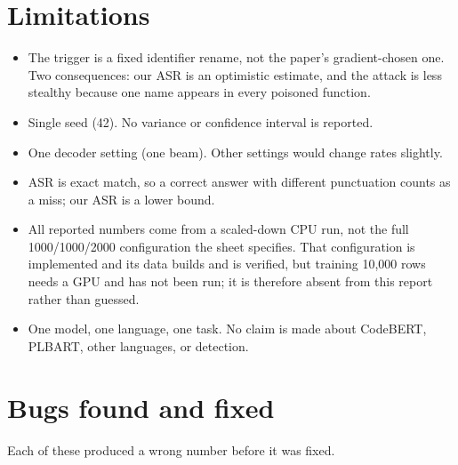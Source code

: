 \documentclass[11pt,a4paper]{article}
\begin{document}
\section{Limitations}

\begin{itemize}
  \item The trigger is a fixed identifier rename, not the paper's gradient-chosen
        one. Two consequences: our ASR is an optimistic estimate, and the attack is
        less stealthy because one name appears in every poisoned function.
  \item Single seed (42). No variance or confidence interval is reported.
  \item One decoder setting (one beam). Other settings would change rates slightly.
  \item ASR is exact match, so a correct answer with different punctuation counts as
        a miss; our ASR is a lower bound.
  \item All reported numbers come from a scaled-down CPU run, not the full
        1000/1000/2000 configuration the sheet specifies. That configuration is
        implemented and its data builds and is verified, but training 10{,}000 rows
        needs a GPU and has not been run; it is therefore absent from this report
        rather than guessed.
  \item One model, one language, one task. No claim is made about CodeBERT, PLBART,
        other languages, or detection.
\end{itemize}

\section{Bugs found and fixed}

Each of these produced a wrong number before it was fixed.
\end{document}
